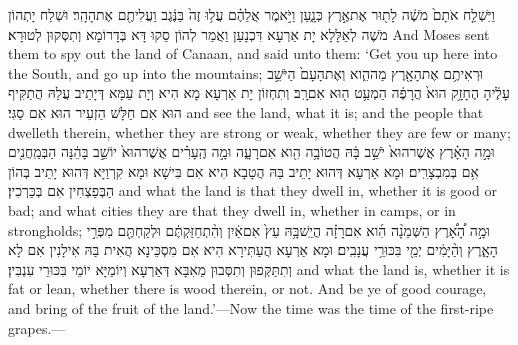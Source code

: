 {וַיִּשְׁלַ֤ח אֹתָם֙ מֹשֶׁ֔ה לָת֖וּר אֶת\maqqaf אֶ֣רֶץ כְּנָ֑עַן וַיֹּ֣אמֶר אֲלֵהֶ֗ם עֲל֥וּ זֶה֙ בַּנֶּ֔גֶב וַעֲלִיתֶ֖ם אֶת\maqqaf הָהָֽר׃}
{וּשְׁלַח יָתְהוֹן מֹשֶׁה לְאַלָּלָא יָת אַרְעָא דִּכְנָעַן וַאֲמַר לְהוֹן סַקוּ דָּא בְּדָרוֹמָא וְתִסְּקוּן לְטוּרָא׃}
{And Moses sent them to spy out the land of Canaan, and said unto them: ‘Get you up here into the South, and go up into the mountains;}{}
{וּרְאִיתֶ֥ם אֶת\maqqaf הָאָ֖רֶץ מַה\maqqaf הִ֑וא וְאֶת\maqqaf הָעָם֙ הַיֹּשֵׁ֣ב עָלֶ֔יהָ הֶחָזָ֥ק הוּא֙ הֲרָפֶ֔ה הַמְעַ֥ט ה֖וּא אִם\maqqaf רָֽב׃}
{וְתִחְזוֹן יָת אַרְעָא מָא הִיא וְיָת עַמָּא דְּיָתֵיב עֲלַהּ הֲתַקִּיף הוּא אִם חַלָּשׁ הַזְעֵיר הוּא אִם סַגִּי׃}
{and see the land, what it is; and the people that dwelleth therein, whether they are strong or weak, whether they are few or many;}{}
{וּמָ֣ה הָאָ֗רֶץ אֲשֶׁר\maqqaf הוּא֙ יֹשֵׁ֣ב בָּ֔הּ הֲטוֹבָ֥ה הִ֖וא אִם\maqqaf רָעָ֑ה וּמָ֣ה הֶֽעָרִ֗ים אֲשֶׁר\maqqaf הוּא֙ יוֹשֵׁ֣ב בָּהֵ֔נָּה הַבְּמַֽחֲנִ֖ים אִ֥ם בְּמִבְצָרִֽים׃}
{וּמָא אַרְעָא דְּהוּא יָתֵיב בַּהּ הֲטָבָא הִיא אִם בִּישָׁא וּמָא קִרְוַיָּא דְּהוּא יָתֵיב בְּהוֹן הַבְּפַצְחִין אִם בְּכַּרְכִין׃}
{and what the land is that they dwell in, whether it is good or bad; and what cities they are that they dwell in, whether in camps, or in strongholds;}{}
{וּמָ֣ה הָ֠אָ֠רֶץ הַשְּׁמֵנָ֨ה הִ֜וא אִם\maqqaf רָזָ֗ה הֲיֵֽשׁ\maqqaf בָּ֥הּ עֵץ֙ אִם\maqqaf אַ֔יִן וְהִ֨תְחַזַּקְתֶּ֔ם וּלְקַחְתֶּ֖ם מִפְּרִ֣י הָאָ֑רֶץ וְהַ֨יָּמִ֔ים יְמֵ֖י בִּכּוּרֵ֥י עֲנָבִֽים׃}
{וּמָא אַרְעָא הֲעַתִּירָא הִיא אִם מִסְכֵּינָא הֲאִית בַּהּ אִילָנִין אִם לָא וְתִתַּקְּפוּן וְתִסְּבוּן מֵאִבָּא דְּאַרְעָא וְיוֹמַיָּא יוֹמֵי בִּכּוּרֵי עִנְבִּין׃}
{and what the land is, whether it is fat or lean, whether there is wood therein, or not. And be ye of good courage, and bring of the fruit of the land.’—Now the time was the time of the first-ripe grapes.—}{}
